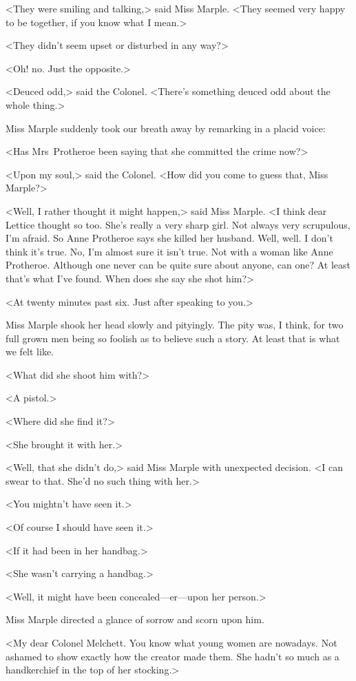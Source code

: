 <They were smiling and talking,> said Miss Marple. <They seemed very happy to be together, if you know what I mean.>

<They didn't seem upset or disturbed in any way?>

<Oh! no. Just the opposite.>

<Deuced odd,> said the Colonel. <There's something deuced odd about the whole thing.>

Miss Marple suddenly took our breath away by remarking in a placid voice:

<Has Mrs~Protheroe been saying that she committed the crime now?>

<Upon my soul,> said the Colonel. <How did you come to guess that, Miss Marple?>

<Well, I rather thought it might happen,> said Miss Marple. <I think dear Lettice thought so too. She's really a very sharp girl. Not always very scrupulous, I'm afraid. So Anne Protheroe says she killed her husband. Well, well. I don't think it's true. No, I'm almost sure it isn't true. Not with a woman like Anne Protheroe. Although one never can be quite sure about anyone, can one? At least that's what I've found. When does she say she shot him?>

<At twenty minutes past six. Just after speaking to you.>

Miss Marple shook her head slowly and pityingly. The pity was, I think, for two full grown men being so foolish as to believe such a story. At least that is what we felt like.

<What did she shoot him with?>

<A pistol.>

<Where did she find it?>

<She brought it with her.>

<Well, that she didn't do,> said Miss Marple with unexpected decision. <I can swear to that. She'd no such thing with her.>

<You mightn't have seen it.>

<Of course I should have seen it.>

<If it had been in her handbag.>

<She wasn't carrying a handbag.>

<Well, it might have been concealed—er—upon her person.>

Miss Marple directed a glance of sorrow and scorn upon him.

<My dear Colonel Melchett. You know what young women are nowadays. Not ashamed to show exactly how the creator made them. She hadn't so much as a handkerchief in the top of her stocking.>

